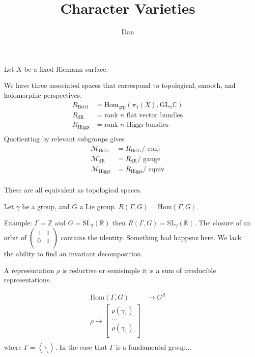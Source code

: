 % 



\title{Character Varieties}
\author{Dan} 
\date{}

 
\maketitle

Let $X$ be a fixed Riemann surface. 

We have three associated spaces that correspond to topological, smooth, and holomorphic perspectives. 
\begin{align}
    R_{\mbox{Betti} } & = \mathrm{Hom} _{\mathrm{grp}} ( \pi_1 (X) , \mathrm{GL}_n \mathbb{C} ) \\
    R_{\mbox{dR} } & = \mbox{rank $n$ flat vector bundles} \\
    R_{\mbox{Higgs} } & = \mbox{rank $n$ Higgs bundles} \\
\end{align}
Quotienting by relevant subgroups gives 
\begin{align}
    \mathcal{M}_{\mbox{Betti} } & =  R_{\mbox{Betti} } / \mbox{ conj} \\
    \mathcal{M}_{\mbox{dR} } &     =  R_{\mbox{dR} } / \mbox{ gauge} \\
    \mathcal{M}_{\mbox{Higgs} } &   = R_{\mbox{Higgs} } / \mbox{ equiv} \\
\end{align}

These are all equivalent as topological spaces. 

Let $\gamma$ be a group, and $ G$ a Lie group. 
$R(\Gamma, G) = \mathrm{Hom}(\Gamma, G) $. 

Example: $ \Gamma = \mathbb{Z}  $ and $ G = \mathrm{SL}_2 ( \mathbb{R} ) $ then $ R(\Gamma, G) = \mathrm{SL}_2 ( \mathbb{R} ) $. 
The closure of an orbit of $ \left( \begin{array}{rr} 1 & 1 \\ 0 & 1 \\ \end{array} \right) $ contains the identity. 
Something bad happens here. 
We lack the ability to find an invariant decomposition. 

\begin{definition}
A representation $ \rho $ is reductive or semisimple it is a sum of irreducible representations. 
\end{definition}

\begin{align}
    \mathrm{Hom}(\Gamma, G) & \rightarrow  G^d \\
    \rho \mapsto \left[ \begin{array}{r}
        \rho(\gamma_1)\\ 
        \dots \\
        \rho(\gamma_1)\\ 
    \end{array} \right]  \\
\end{align}
where $ \Gamma  = \left< \gamma_i \right> $. 
In the case that $ \Gamma$ is a fundamental group...

